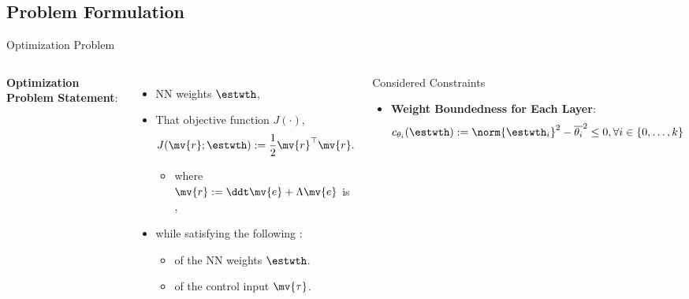 \documentclass[8pt, aspectratio=169]{beamer}
\newcommand{\ctxt}[2]{\color{#1}{#2}\color{black} }
\begin{document}
\subsection{Problem Formulation}

\begin{frame}{\insertsubsectionhead}{Optimization Problem}

\begin{columns}


    \textbf{Optimization Problem Statement}:

    \begin{itemize}
      \item \ctxt{awesome}{Find } NN weights $\estwth$,
      \item That \ctxt{airforceblue}{minimize } objective function $J(\cdot)$,
        \begin{equation}\label{eq:obj}
          J(\mv{r};\estwth)
          := 
          \frac{1}{2} \mv{r}^\top \mv{r}.
        \end{equation}
        \begin{itemize}
          \item where $\mv{r} := \ddt\mv{e} + \Lambda\mv{e}$ is \ctxt{awesome}{filtered tracking error},
        \end{itemize}
      \item while satisfying the following \ctxt{awesome}{constraints}:
        \begin{itemize}
          \item \ctxt{airforceblue}{Boundedness } of the NN weights $\estwth$.
          \item \ctxt{airforceblue}{Saturation } of the control input $\mv{\tau}$.
        \end{itemize}
    \end{itemize}

  

  {
    \begin{block}{Considered Constraints}

      \begin{itemize}
        \item \textbf{Weight Boundedness for Each Layer}: 
          \begin{equation}\label{eq:cstr:weight}
            c_{\theta_i}(\estwth)
            :=
            \norm{\estwth_i}^2 - \overline{\theta_i}^2 \le 0
            , 
            \forall i\in\{0,\ldots,k\}
          \end{equation}


\end{itemize}
\end{block}}
\end{columns}
\end{frame}
\end{document}
